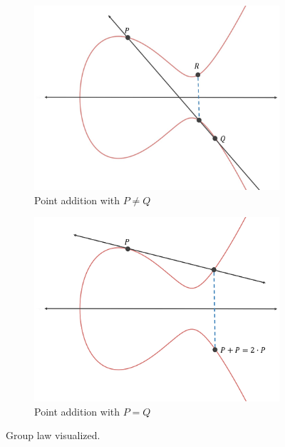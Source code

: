 \documentclass{article}
\begin{document}
\begin{figure}[htbp]
    \begin{subfigure}[t]{.45\textwidth}
        \centering
        \includegraphics[scale = 0.12]{images/point_addition.jpeg}
        \caption{Point addition with $P \ne Q$}
        \label{fig:point_addition}
    \end{subfigure}
    \begin{subfigure}[t]{.45\textwidth}
        \centering
        \includegraphics[scale = 0.6]{images/point_scalar_multiplication.png}
        \caption{Point addition with $P = Q$}
        \label{fig:point_multiplication}
    \end{subfigure}
    \caption{Group law visualized.}
    \label{fig:group_law}
\end{figure}
\end{document}
